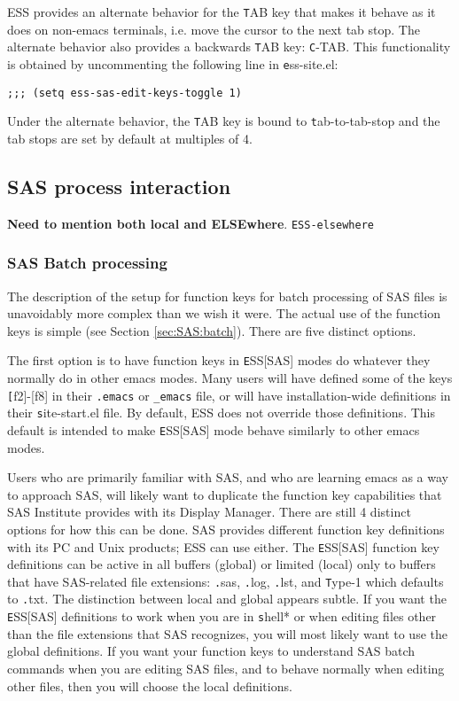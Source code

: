 \documentclass{article}
\begin{document}
ESS provides an alternate behavior for the {\texttt TAB} key that makes it
behave as it does on non-emacs terminals, i.e. move the cursor to the
next tab stop.  The alternate behavior also provides a backwards {\texttt
  TAB} key: {\texttt C-TAB}.  This functionality is obtained by
uncommenting the following line in {\texttt ess-site.el}:
\begin{verbatim}
;;; (setq ess-sas-edit-keys-toggle 1)
\end{verbatim}
Under the alternate behavior, the {\texttt TAB} key is bound to {\texttt
  tab-to-tab-stop} and the tab stops are set by default at multiples
of 4.

\subsection{SAS process interaction}
\label{sec:SAS:proc}

\textbf{Need to mention both local and ELSEwhere}.  \texttt{ESS-elsewhere}

\subsubsection{SAS Batch processing}
\label{sec:SAS:proc:batch}

The description of the setup for function keys for batch processing of
SAS files is unavoidably more complex than we wish it were.  The actual
use of the function keys is simple (see Section \ref{sec:SAS:batch}).
There are five distinct options.

The first option is to have function keys in {\texttt ESS[SAS]} modes do
whatever they normally do in other emacs modes.  Many users will have
defined some of the keys {\texttt[f2]-[f8]} in their \verb+.emacs+ or
\verb|_emacs| file, or will have installation-wide definitions in
their {\texttt site-start.el} file.  By default, ESS does not override those
definitions.  This default is intended to make {\texttt ESS[SAS]} mode behave
similarly to other emacs modes.

Users who are primarily familiar with SAS, and who are learning emacs
as a way to approach SAS, will likely want to duplicate the function
key capabilities that SAS Institute provides with its Display Manager.
There are still 4 distinct options for how this can be done.  SAS
provides different function key definitions with its PC and Unix
products; ESS can use either.  The {\texttt ESS[SAS]} function key definitions
can be active in all buffers (global) or limited (local) only to
buffers that have SAS-related file extensions: {\texttt .sas}, {\texttt .log}, {\texttt .lst}, and
{\texttt Type-1} which defaults to {\texttt .txt}.  The distinction between local and
global appears subtle.  If you want the {\texttt ESS[SAS]} definitions to work
when you are in {\texttt *shell*} or when editing files other than the file
extensions that SAS recognizes, you will most likely want to use the
global definitions.  If you want your function keys to understand SAS
batch commands when you are editing SAS files, and to behave normally
when editing other files, then you will choose the local definitions.
\end{document}
